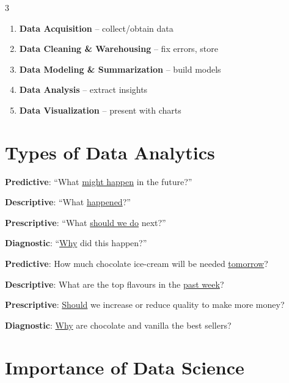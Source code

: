 \documentclass[a4paper,7pt]{extarticle}
\begin{document}
\begin{multicols}{3}
\begin{warnbox}
\begin{enumerate}
  \item \textbf{Data Acquisition} -- collect/obtain data
  \item \textbf{Data Cleaning \& Warehousing} -- fix errors, store
  \item \textbf{Data Modeling \& Summarization} -- build models
  \item \textbf{Data Analysis} -- extract insights
  \item \textbf{Data Visualization} -- present with charts
\end{enumerate}
\end{warnbox}

\section{Types of Data Analytics}

\begin{defbox}[4 Types]
\textbf{Predictive}: ``What \underline{might happen} in the future?''

\textbf{Descriptive}: ``What \underline{happened}?''

\textbf{Prescriptive}: ``What \underline{should we do} next?''

\textbf{Diagnostic}: ``\underline{Why} did this happen?''
\end{defbox}

\begin{exbox}
\textbf{Predictive}: How much chocolate ice-cream will be needed \underline{tomorrow}?

\textbf{Descriptive}: What are the top flavours in the \underline{past week}?

\textbf{Prescriptive}: \underline{Should} we increase or reduce quality to make more money?

\textbf{Diagnostic}: \underline{Why} are chocolate and vanilla the best sellers?
\end{exbox}

\section{Importance of Data Science}


\end{multicols}
\end{document}
